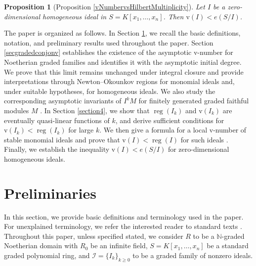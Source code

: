 \documentclass[11pt,reqno,a4paper]{amsart}
\newtheorem{proposition}[theorem]{Proposition}
\theoremstyle{definition}
\begin{document}
\begin{proposition}[Proposition \ref{vNumbervsHilbertMultiplicity}]
    Let $I$ be a zero-dimensional homogeneous ideal in  $S = K[x_1, \dots, x_n]$. Then $\mathrm{v}(I) < e(S/I)$.
\end{proposition}


The paper is organized as follows. In Section \ref{secpreli}, we recall the basic definitions, notation, and preliminary results used throughout the paper. Section \ref{secgradedconjonv} establishes the existence of the asymptotic $\mathrm{v}$-number for Noetherian graded families and identifies it with the asymptotic initial degree. We prove that this limit remains unchanged under integral closure  and provide interpretations through Newton--Okounkov regions for monomial ideals and, under suitable hypotheses, for homogeneous ideals. We also study the corresponding asymptotic invariants of $I^kM$ for finitely generated graded faithful modules $M$ . In Section \ref{section4}, we show that $\operatorname{reg}(I_k)$ and $\mathrm{v}(I_k)$ are eventually  quasi-linear functions of $k$, and derive sufficient conditions for $\mathrm{v}(I_k)<\operatorname{reg}(I_k)$ for large $k$. We then give a formula for a local $\mathrm{v}$-number of stable monomial ideals  and prove that $\mathrm{v}(I)<\operatorname{reg}(I)$ for such ideals . Finally, we establish the inequality $\mathrm{v}(I)<e(S/I)$ for zero-dimensional homogeneous ideals.








\section{Preliminaries}\label{secpreli}





In this section, we provide basic definitions and terminology used in the paper. For unexplained terminology, we refer the interested reader to standard texts \cite{Barvinok02} \cite{HerzogHibi11} \cite{HunekeSwanson06}.  \\ 
Throughout this paper, unless specified stated, we consider $R$  to be a $\mathbb{N}$-graded Noetherian domain with $R_0$ be an infinite field, $S = K[x_1,\ldots,x_n]$ be a standard graded polynomial ring, and $\mathcal{I} = \{I_k\}_{k \geq 0}$ to be a graded family of nonzero ideals.
\end{document}
